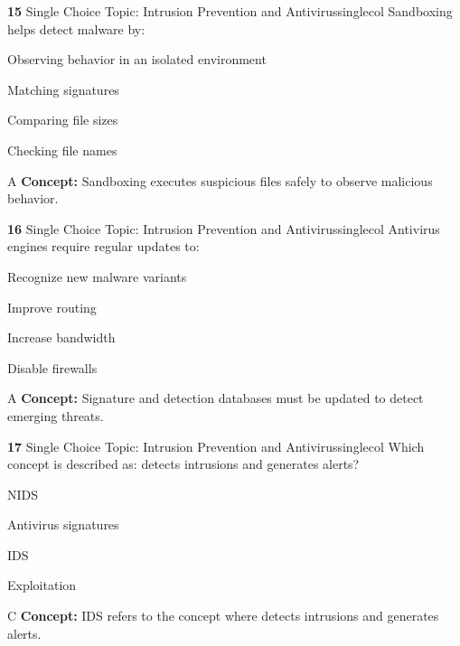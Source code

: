 \documentclass[10pt,a4paper]{article}
\begin{document}
\begin{qcard}{\color{white}\textbf{15} \hfill \small Single Choice \textbar{} Topic: Intrusion Prevention and Antivirus}{singlecol}
Sandboxing helps detect malware by:

\begin{qoptions}
\item Observing behavior in an isolated environment
\item Matching signatures
\item Comparing file sizes
\item Checking file names
\end{qoptions}
\begin{explainbox}{A}
\textbf{Concept:} Sandboxing executes suspicious files safely to observe malicious behavior.
\end{explainbox}
\end{qcard}

\begin{qcard}{\color{white}\textbf{16} \hfill \small Single Choice \textbar{} Topic: Intrusion Prevention and Antivirus}{singlecol}
Antivirus engines require regular updates to:

\begin{qoptions}
\item Recognize new malware variants
\item Improve routing
\item Increase bandwidth
\item Disable firewalls
\end{qoptions}
\begin{explainbox}{A}
\textbf{Concept:} Signature and detection databases must be updated to detect emerging threats.
\end{explainbox}
\end{qcard}

\begin{qcard}{\color{white}\textbf{17} \hfill \small Single Choice \textbar{} Topic: Intrusion Prevention and Antivirus}{singlecol}
Which concept is described as: detects intrusions and generates alerts?

\begin{qoptions}
\item NIDS
\item Antivirus signatures
\item IDS
\item Exploitation
\end{qoptions}
\begin{explainbox}{C}
\textbf{Concept:} IDS refers to the concept where detects intrusions and generates alerts.
\end{explainbox}
\end{qcard}
\end{document}
